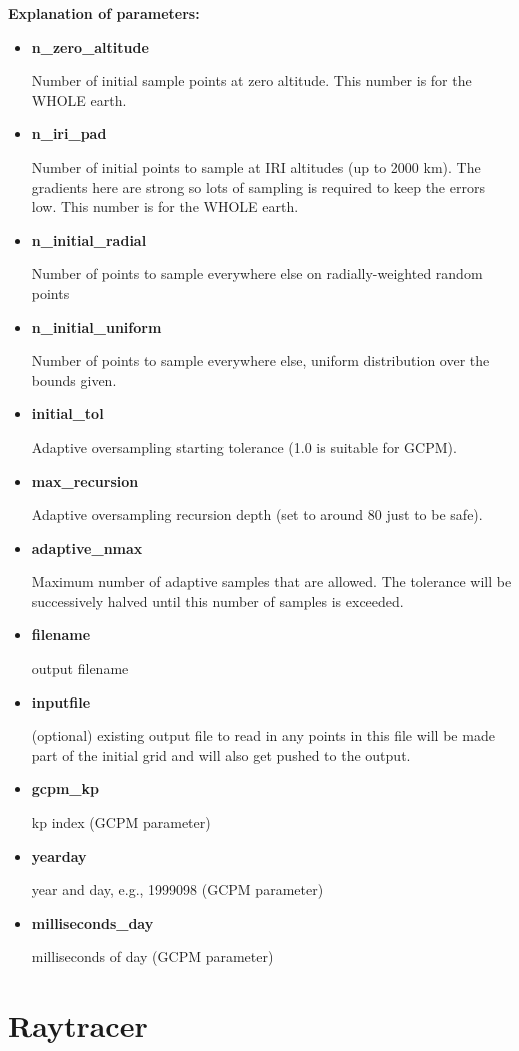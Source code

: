 \documentclass[10pt]{article}
\begin{document}
{\bf Explanation of parameters:}
\begin{itemize}
\item {\bf n\_zero\_altitude}

  Number of initial sample points at zero altitude.  This number is for the
  WHOLE earth.
\item {\bf  n\_iri\_pad      }

  Number of initial points to sample at IRI altitudes (up to 2000 km).
  The gradients here are strong so lots of sampling is required to
  keep the errors low.  This number is for the WHOLE earth.
\item {\bf n\_initial\_radial}

  Number of points to sample everywhere else on radially-weighted random points
\item {\bf n\_initial\_uniform}

 Number of points to sample everywhere else, uniform distribution over
 the bounds given.
\item {\bf initial\_tol     }

  Adaptive oversampling starting tolerance (1.0 is suitable for GCPM).
\item  {\bf max\_recursion   }

  Adaptive oversampling recursion depth (set to around 80 just to be safe).
\item {\bf adaptive\_nmax   }

  Maximum number of adaptive samples that are allowed.  The tolerance
  will be successively halved until this number of samples is
  exceeded.
\item {\bf filename        }

  output filename
\item {\bf inputfile       }

  (optional) existing output file to read in any points in this file
  will be made part of the initial grid and will also get pushed to
  the output.
\item {\bf gcpm\_kp         }

  kp index (GCPM parameter)
\item {\bf yearday         }

  year and day, e.g., 1999098 (GCPM parameter)
\item {\bf milliseconds\_day}

  milliseconds of day (GCPM parameter)
\end{itemize}

\section{Raytracer}
\end{document}

